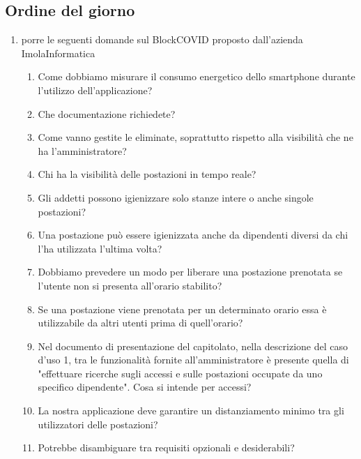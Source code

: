 \subsection*{Ordine del giorno}
	\begin{enumerate}
	\item porre le seguenti domande sul  BlockCOVID proposto dall'azienda ImolaInformatica
		\begin{enumerate}
			\item Come dobbiamo misurare il consumo energetico dello smartphone durante l'utilizzo dell'applicazione?
			
			\item Che documentazione richiedete?
			
			\item Come vanno gestite le  eliminate, soprattutto rispetto alla visibilità che ne ha l'amministratore?
			
			\item Chi ha la visibilità delle postazioni in tempo reale?
			
			\item Gli addetti possono igienizzare solo stanze intere o anche singole postazioni?
			
			\item Una postazione può essere igienizzata anche da dipendenti diversi da chi l'ha utilizzata l'ultima volta?
			
			\item Dobbiamo prevedere un modo per liberare una postazione prenotata se l'utente non si presenta all'orario stabilito?
			
			\item Se una postazione viene prenotata per un determinato orario essa è utilizzabile da altri utenti prima di quell'orario?
			
			\item Nel documento di presentazione del capitolato, nella descrizione del caso d'uso 1, tra le funzionalità fornite all'amministratore è presente quella di "effettuare ricerche sugli accessi e sulle postazioni occupate da uno specifico dipendente". Cosa si intende per accessi?
			
			\item La nostra applicazione deve garantire un distanziamento minimo tra gli utilizzatori delle postazioni?
			
			\item Potrebbe disambiguare tra requisiti opzionali e desiderabili?
			
		\end{enumerate}
	\end{enumerate}

